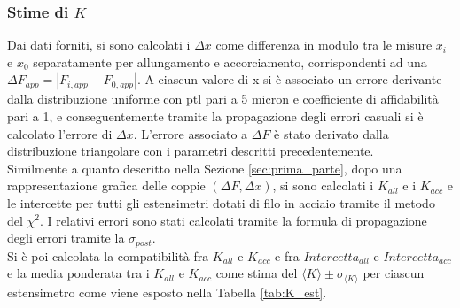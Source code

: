 \documentclass[a4paper,11pt,oneside]{article}
\begin{document}
\subsubsection*{Stime di $K$}
Dai dati forniti, si sono calcolati i $\Delta x$ come differenza in modulo tra le misure $x_i$ e $x_0$ separatamente per allungamento e accorciamento, corrispondenti ad una $\Delta F_{app} =\left | F_{i, app} - F_{0, app} \right |$. A ciascun valore di x si è associato un errore derivante dalla distribuzione uniforme con ptl pari a 5 micron e coefficiente di affidabilità pari a 1, e conseguentemente tramite la propagazione degli errori casuali si è calcolato l'errore di  $\Delta x$. L'errore associato a $\Delta F$ è stato derivato dalla distribuzione triangolare con i parametri descritti precedentemente.\\
Similmente a quanto descritto nella Sezione \ref{sec:prima_parte}, dopo una rappresentazione grafica delle coppie $(\Delta F, \Delta x)$, si sono calcolati i $K_{all}$ e i $K_{acc}$ e le intercette per tutti gli estensimetri dotati di filo in acciaio tramite il metodo del $\chi^2$. I relativi errori sono stati calcolati  tramite la formula di propagazione degli errori tramite la $\sigma_{post}$.\\
Si è poi calcolata la compatibilità fra $K_{all}$ e $K_{acc}$ e fra $Intercetta_{all}$ e $Intercetta_{acc}$ e la media ponderata tra i $K_{all}$ e $K_{acc}$ come stima del ${\langle K \rangle }\pm \sigma_{{\langle K\rangle }}$ per ciascun estensimetro come viene esposto nella Tabella \ref{tab:K_est}.
\end{document}

